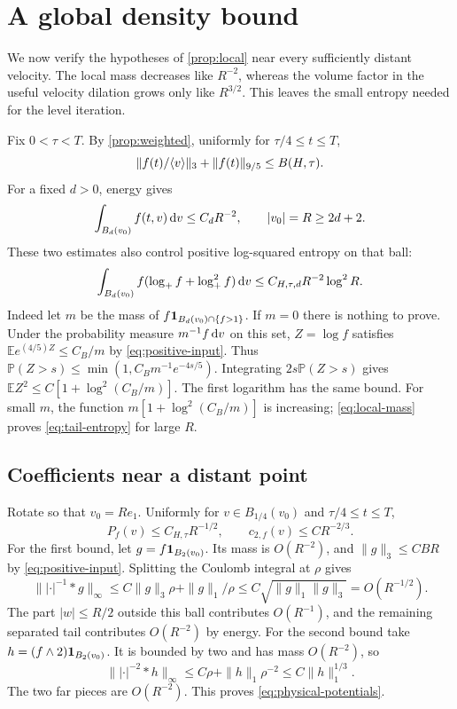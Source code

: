 \section{A global density bound}\label{sec:global}

We now verify the hypotheses of \cref{prop:local} near every sufficiently distant velocity. The local mass decreases like $R^{-2}$, whereas the volume factor in the useful velocity dilation grows only like $R^{3/2}$. This leaves the small entropy needed for the level iteration.

Fix $0<\tau<T$. By \cref{prop:weighted}, uniformly for $\tau/4\le t\le T$,
\begin{equation}\label{eq:positive-input}
 \|f(t)/\langle v\rangle\|_3+\|f(t)\|_{9/5}\le B(H,\tau).
\end{equation}
For a fixed $d>0$, energy gives
\begin{equation}\label{eq:local-mass}
 \int_{B_d(v_0)}f(t,v)\,\mathrm dv\le C_dR^{-2},\qquad |v_0|=R\ge2d+2.
\end{equation}
These two estimates also control positive log-squared entropy on that ball:
\begin{equation}\label{eq:tail-entropy}
 \int_{B_d(v_0)}f(\log_+f+\log_+^2f)\,\mathrm dv
 \le C_{H,\tau,d}R^{-2}\log^2R.
\end{equation}
Indeed let $m$ be the mass of $f\mathbf 1_{B_d(v_0)\cap\{f>1\}}$. If $m=0$ there is nothing to prove. Under the probability measure $m^{-1}f\,\mathrm dv$ on this set, $Z=\log f$ satisfies
$\mathbb E e^{(4/5)Z}\le C_B/m$ by \eqref{eq:positive-input}. Thus
$\mathbb P(Z>s)\le\min(1,C_Bm^{-1}e^{-4s/5})$.
Integrating $2s\mathbb P(Z>s)$ gives
$\mathbb EZ^2\le C[1+\log^2(C_B/m)]$. The first logarithm has the same bound. For small $m$, the function $m[1+\log^2(C_B/m)]$ is increasing; \eqref{eq:local-mass} proves \eqref{eq:tail-entropy} for large $R$.

\subsection{Coefficients near a distant point}

Rotate so that $v_0=Re_1$. Uniformly for $v\in B_{1/4}(v_0)$ and $\tau/4\le t\le T$,
\begin{equation}\label{eq:physical-potentials}
 P_f(v)\le C_{H,\tau}R^{-1/2},\qquad
 c_{2,f}(v)\le CR^{-2/3}.
\end{equation}
For the first bound, let $g=f\mathbf 1_{B_2(v_0)}$. Its mass is $O(R^{-2})$, and $\|g\|_3\le CBR$ by \eqref{eq:positive-input}. Splitting the Coulomb integral at $\rho$ gives
\[
 \||\cdot|^{-1}*g\|_\infty
 \le C\|g\|_3\rho+\|g\|_1/\rho
 \le C\sqrt{\|g\|_1\|g\|_3}=O(R^{-1/2}).
\]
The part $|w|\le R/2$ outside this ball contributes $O(R^{-1})$, and the remaining separated tail contributes $O(R^{-2})$ by energy. For the second bound take $h=(f\wedge2)\mathbf 1_{B_2(v_0)}$. It is bounded by two and has mass $O(R^{-2})$, so
\[
 \||\cdot|^{-2}*h\|_\infty\le C\rho+\|h\|_1\rho^{-2}
 \le C\|h\|_1^{1/3}.
\]
The two far pieces are $O(R^{-2})$. This proves \eqref{eq:physical-potentials}.

